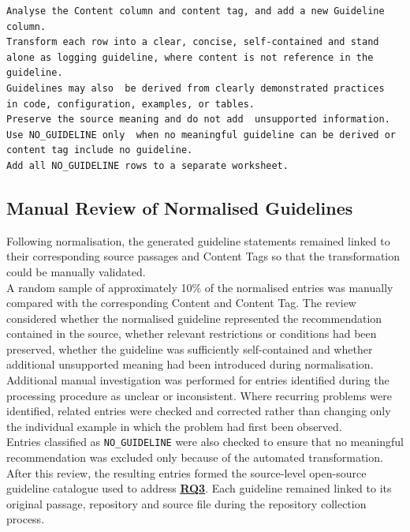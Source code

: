 \begin{listing}[H]
\begin{verbatim}
Analyse the Content column and content tag, and add a new Guideline column.
Transform each row into a clear, concise, self-contained and stand
alone as logging guideline, where content is not reference in the guideline.
Guidelines may also  be derived from clearly demonstrated practices
in code, configuration, examples, or tables.
Preserve the source meaning and do not add  unsupported information.
Use NO_GUIDELINE only  when no meaningful guideline can be derived or
content tag include no guideline.
Add all NO_GUIDELINE rows to a separate worksheet.
\end{verbatim}
\caption{Prompt for guideline formulation and normalization}
\label{lst:prompt_guideline_normalization}
\end{listing}

\subsection{Manual Review of Normalised Guidelines}

Following normalisation, the generated guideline statements remained linked to their
corresponding source passages and Content Tags so that the transformation
could be manually validated.
\\
A random sample of approximately 10\% of the normalised entries was manually
compared with the corresponding Content and Content Tag. The review considered whether
the normalised guideline represented the recommendation contained in the source,
whether relevant restrictions or conditions had been preserved, whether the guideline
was sufficiently self-contained and whether additional unsupported meaning had been
introduced during normalisation.
\\
Additional manual investigation was performed for entries identified during the
processing procedure as unclear or inconsistent. Where recurring problems were
identified, related entries were checked and corrected rather than changing only the
individual example in which the problem had first been observed.
\\
Entries classified as \texttt{NO\_GUIDELINE} were also checked to ensure that no
meaningful recommendation was excluded only because of the automated transformation.
\\
After this review, the resulting entries formed the source-level open-source guideline
catalogue used to address \hyperref[table:t1rq]{\textbf{RQ3}}. Each guideline remained linked to its original
passage, repository and source file during the repository collection process.

